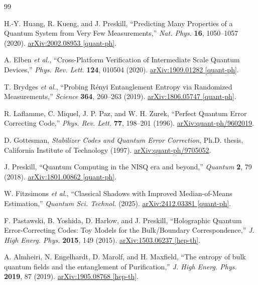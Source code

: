 \documentclass[12pt,a4paper,oneside]{book}
\theoremstyle{definition}
\theoremstyle{remark}
\begin{document}
\begin{thebibliography}{99}

H.-Y. Huang, R. Kueng, and J. Preskill,
``Predicting Many Properties of a Quantum System from Very Few Measurements,''
\textit{Nat. Phys.} \textbf{16}, 1050--1057 (2020).
\href{https://arxiv.org/abs/2002.08953}{arXiv:2002.08953 [quant-ph]}.

A. Elben \textit{et al.},
``Cross-Platform Verification of Intermediate Scale Quantum Devices,''
\textit{Phys. Rev. Lett.} \textbf{124}, 010504 (2020).
\href{https://arxiv.org/abs/1909.01282}{arXiv:1909.01282 [quant-ph]}.

T. Brydges \textit{et al.},
``Probing Rényi Entanglement Entropy via Randomized Measurements,''
\textit{Science} \textbf{364}, 260--263 (2019).
\href{https://arxiv.org/abs/1806.05747}{arXiv:1806.05747 [quant-ph]}.

R. Laflamme, C. Miquel, J. P. Paz, and W. H. Zurek,
``Perfect Quantum Error Correcting Code,''
\textit{Phys. Rev. Lett.} \textbf{77}, 198--201 (1996).
\href{https://arxiv.org/abs/quant-ph/9602019}{arXiv:quant-ph/9602019}.

D. Gottesman,
\textit{Stabilizer Codes and Quantum Error Correction},
Ph.D. thesis, California Institute of Technology (1997).
\href{https://arxiv.org/abs/quant-ph/9705052}{arXiv:quant-ph/9705052}.

J. Preskill,
``Quantum Computing in the NISQ era and beyond,''
\textit{Quantum} \textbf{2}, 79 (2018).
\href{https://arxiv.org/abs/1801.00862}{arXiv:1801.00862 [quant-ph]}.

W. Fitzsimons \textit{et al.},
``Classical Shadows with Improved Median-of-Means Estimation,''
\textit{Quantum Sci. Technol.} (2025).
\href{https://arxiv.org/abs/2412.03381}{arXiv:2412.03381 [quant-ph]}.

F. Pastawski, B. Yoshida, D. Harlow, and J. Preskill,
``Holographic Quantum Error-Correcting Codes: Toy Models for the Bulk/Boundary Correspondence,''
\textit{J. High Energ. Phys.} \textbf{2015}, 149 (2015).
\href{https://arxiv.org/abs/1503.06237}{arXiv:1503.06237 [hep-th]}.

A. Almheiri, N. Engelhardt, D. Marolf, and H. Maxfield,
``The entropy of bulk quantum fields and the entanglement of Purification,''
\textit{J. High Energ. Phys.} \textbf{2019}, 87 (2019).
\href{https://arxiv.org/abs/1905.08768}{arXiv:1905.08768 [hep-th]}.


\end{thebibliography}
\end{document}
